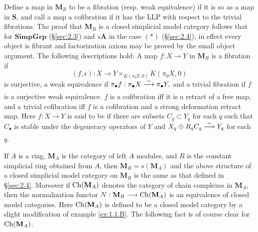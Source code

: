 \documentclass[../main]{subfiles}
\begin{document}
Define a map in $\mathbf{M}_R$ to be a fibration (resp. weak equivalence) if it is so as a map in $\mathbf{S}$, and call a map a cofibration if it has the LLP with respect to the trivial fibrations. The proof that $\mathbf{M}_R$ is a closed simplicial model category follows that for $\mathbf{SimpGrp}$ (\S\ref{sec:2.3}) and $s\mathbf{A}$ in the case $(*)$ (\S\ref{sec:2.4}); in effect every object is fibrant and factorization axiom may be proved by the small object argument. The following descriptions hold: A map $f:X\longrightarrow Y$ in $\mathbf{M}_R$ is a fibration if
\[(f,\epsilon):X\longrightarrow Y\times_{K(\pi_{0}Y,0)}K(\pi_{0}X,0)\]is surjective, a weak equivalence if $\pi_{\bullet}f:\pi_{\bullet}X\varrightarrow{\sim}\pi_{\bullet}Y,$
and a trivial fibration if $f$ is a surjective weak equivalence. $f$ is a cofibration iff it is a retract of a free map, and a trivial cofibration iff $f$ is a cofibration and a strong deformation retract map. Here $f:X\longrightarrow Y$ is said to be  if there are subsets $C_q\subset Y_q$ for each $q$ such that $C_{\bullet}$ is stable under the degeneracy operators of $Y$ and $X_q\oplus R_qC_q\varrightarrow{\sim}Y_q$ for each $q$.

If $A$ is a ring, $\mathbf{M}_A$ is the category of left $A$ modules, and $R$ is the constant simplicial ring obtained from $A$, then $\mathbf{M}_R=s(\mathbf{M}_A)$ and the above structure of a closed simplicial model category on $\mathbf{M}_R$ is the same as that defined in \S\ref{sec:2.4}. Moreover if $\operatorname{Ch}(\mathbf{M}_A)$ denotes the category of chain complexes in $\mathbf{M}_A$, then the normalization functor $N:\mathbf{M}_R\longrightarrow\operatorname{Ch}(\mathbf{M}_A)$ is an equivalence of closed model categories. Here $\operatorname{Ch}(\mathbf{M}_A)$ is defined to be a closed model category by a slight modification of example \ref{ex:1.1.B}. The following fact is of course clear for $\operatorname{Ch}(\mathbf{M}_A)$.
\end{document}
